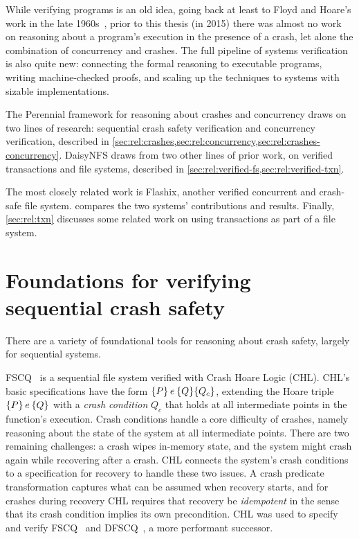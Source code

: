 While verifying programs is an old idea, going back at least to Floyd and
Hoare's work in the late 1960s~\cite{floyd:meanings,hoare:logic}, prior to this
thesis (in 2015) there was almost no work on reasoning about a program's
execution in the presence of a crash, let alone the combination of concurrency
and crashes. The full pipeline of systems verification is also quite new:
connecting the formal reasoning to executable programs, writing machine-checked proofs, and scaling up the techniques to
systems with sizable implementations.

The Perennial framework for reasoning about crashes and concurrency draws on two
lines of research: sequential crash safety verification and concurrency
verification, described in
\cref{sec:rel:crashes,sec:rel:concurrency,sec:rel:crashes-concurrency}. DaisyNFS
draws from two other lines of prior work, on verified transactions and file
systems, described in \cref{sec:rel:verified-fs,sec:rel:verified-txn}.

The most closely related work is Flashix, another verified concurrent and
crash-safe file system.  compares the two systems'
contributions and results. Finally, \cref{sec:rel:txn} discusses some related work
on using transactions as part of a file system.


\section{Foundations for verifying sequential crash safety}
\label{sec:rel:crashes}

There are a variety of foundational tools for reasoning about crash safety,
largely for sequential systems.

FSCQ~\cite{chen:fscq,chen:dfscq,hchen-phd} is a sequential file
system verified with Crash Hoare Logic (CHL). CHL's basic specifications have
the form $\hoareC{P}{e}{Q}{Q_{c}}$, extending the Hoare triple $\hoare{P}{e}{Q}$
with a \emph{crash condition} $Q_{c}$ that holds at all intermediate points in the
function's execution. Crash conditions handle a core difficulty of crashes,
namely reasoning about the state of the system at all intermediate points. There are two
remaining challenges: a crash wipes in-memory state, and the system might crash again
while recovering after a crash. CHL connects the system's crash conditions to a
specification for recovery to handle these two issues. A crash predicate
transformation captures what can be assumed when recovery starts, and for
crashes during recovery CHL requires that recovery be \emph{idempotent} in the
sense that its crash condition implies its own precondition. CHL was used to
specify and verify FSCQ~\cite{chen:fscq} and DFSCQ~\cite{chen:dfscq}, a more
performant successor.


